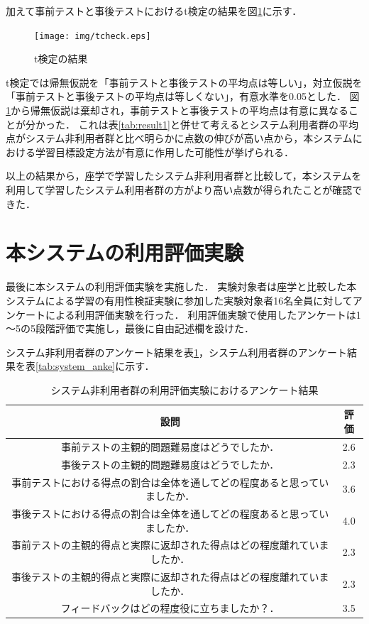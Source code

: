 加えて事前テストと事後テストにおけるt検定の結果を図\ref{fig:tcheck}に示す．
\begin{figure}[htbp]
\begin{center}
\texttt{[image: img/tcheck.eps]}
\end{center}
\caption{t検定の結果}
\label{fig:tcheck}
\end{figure}
t検定では帰無仮説を「事前テストと事後テストの平均点は等しい」，対立仮説を「事前テストと事後テストの平均点は等しくない」，有意水準を0.05とした．
図\ref{fig:tcheck}から帰無仮説は棄却され，事前テストと事後テストの平均点は有意に異なることが分かった．
これは表\ref{tab:result1}と併せて考えるとシステム利用者群の平均点がシステム非利用者群と比べ明らかに点数の伸びが高い点から，本システムにおける学習目標設定方法が有意に作用した可能性が挙げられる．

以上の結果から，座学で学習したシステム非利用者群と比較して，本システムを利用して学習したシステム利用者群の方がより高い点数が得られたことが確認できた．

\newpage

\section{本システムの利用評価実験}
最後に本システムの利用評価実験を実施した．
実験対象者は座学と比較した本システムによる学習の有用性検証実験に参加した実験対象者16名全員に対してアンケートによる利用評価実験を行った．
利用評価実験で使用したアンケートは1～5の5段階評価で実施し，最後に自由記述欄を設けた．

システム非利用者群のアンケート結果を表\ref{tab:unsystem_anke}，システム利用者群のアンケート結果を表\ref{tab:system_anke}に示す．

\begin{table}[tb]
    \centering
    \caption{システム非利用者群の利用評価実験におけるアンケート結果}
    \label{tab:unsystem_anke}
    \begin{tabular}{|c|c|}
    \hline
     設問 & 評価 \\ \hline \hline
     事前テストの主観的問題難易度はどうでしたか． & 2.6 \\ \hline
     事後テストの主観的問題難易度はどうでしたか． & 2.3 \\ \hline
     事前テストにおける得点の割合は全体を通してどの程度あると思っていましたか． & 3.6 \\ \hline
     事後テストにおける得点の割合は全体を通してどの程度あると思っていましたか． & 4.0 \\ \hline
     事前テストの主観的得点と実際に返却された得点はどの程度離れていましたか． & 2.3 \\ \hline
     事後テストの主観的得点と実際に返却された得点はどの程度離れていましたか． & 2.3 \\ \hline
     フィードバックはどの程度役に立ちましたか？． & 3.5 \\ \hline
    \end{tabular}
\end{table}

